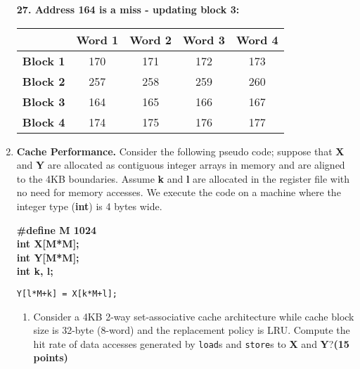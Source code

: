 \documentclass[a4paper, 11pt]{exam}
\begin{document}
\begin{enumerate}
\textbf{27. Address 164 is a miss - updating block 3:}

\begin{center}
	\begin{tabular}{ |c|c|c|c|c| } 
		\hline
		&\textbf{Word 1}& \textbf{Word 2}& \textbf{Word 3} & \textbf{Word 4}\\ 
		\hline
		\textbf{Block 1} & 170 & 171  & 172 & 173\\ 
		\hline
		\textbf{Block 2} & 257 & 258  & 259 & 260\\ 
		\hline
		\textbf{Block 3} & 164 &  165 & 166 & 167\\ 
		\hline
		\textbf{Block 4} & 174 & 175  & 176 & 177\\ 
		\hline
	\end{tabular}
\end{center}


\item \textbf{Cache Performance.}
Consider the following  pseudo code; suppose that \textbf{X} and \textbf{Y} are allocated as contiguous integer arrays in memory and are aligned to the 4KB boundaries.
Assume \textbf{k} and \textbf{l} are allocated in the register file with no need for memory accesses.
We execute the code on a machine where the integer type (\textbf{int}) is 4 bytes wide.

	\begin{algorithm}
		\textbf{\#define M 1024} \\
		\textbf{int X[M*M];} \\
		\textbf{int Y[M*M];} \\
		\textbf{int k, l;}
		\begin{algorithmic}	
			\STATE \texttt{Y[l*M+k] = X[k*M+l];}
			\ENDFOR
			\ENDFOR
		\end{algorithmic}
	\end{algorithm}

\begin{enumerate}
\item Consider a 4KB 2-way set-associative cache architecture while cache block size is 32-byte (8-word) and the replacement policy is LRU. Compute the hit rate of data accesses generated by \texttt{load}s and \texttt{store}s to \textbf{X} and \textbf{Y}?\textbf{(15 points)}





\end{enumerate}
\end{enumerate}
\end{document}
